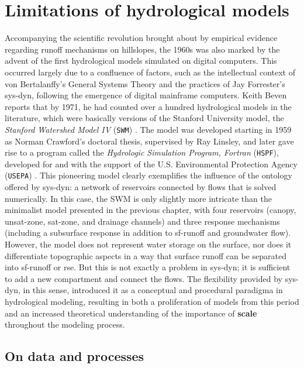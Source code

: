 \documentclass[./main_en.tex]{subfiles}
\begin{document}
\section{Limitations of hydrological models} \label{sec:hydro:others}

\par Accompanying the scientific revolution brought about by empirical evidence regarding runoff mechanisms on hillslopes, the 1960s was also marked by the advent of the first hydrological models simulated on digital computers. This occurred largely due to a confluence of factors, such as the intellectual context of von Bertalanffy's General Systems Theory and the practices of Jay Forrester's \gls{sys-dyn}, following the emergence of digital mainframe computers. Keith Beven reports that by 1971, he had counted over a hundred hydrological models in the literature, which were basically versions of the Stanford University \gls{model}, the \textit{Stanford Watershed Model IV} (\texttt{SWM}) \cite{Beven2019a}. The \gls{model} was developed starting in 1959 as Norman Crawford's doctoral thesis, supervised by Ray Linsley, and later gave rise to a program called the \textit{Hydrologic Simulation Program, Fortran} (\texttt{HSPF}), developed for and with the support of the U.S. Environmental Protection Agency (\texttt{USEPA}) \cite{Burges2004a}. This pioneering \gls{model} clearly exemplifies the influence of the ontology offered by \gls{sys-dyn}: a network of reservoirs connected by flows that is solved numerically. In this case, the SWM is only slightly more intricate than the minimalist \gls{model} presented in the previous chapter, with four reservoirs (canopy, \gls{unsat-zone}, \gls{sat-zone}, and drainage channels) and three response mechanisms (including a subsurface response in addition to \gls{sf-runoff} and groundwater flow). However, the \gls{model} does not represent water storage on the surface, nor does it differentiate topographic aspects in a way that surface runoff can be separated into \gls{sf-runoff} or \gls{rse}. But this is not exactly a problem in \gls{sys-dyn}; it is sufficient to add a new compartment and connect the flows. The flexibility provided by \gls{sys-dyn}, in this sense, introduced it as a conceptual and procedural \gls{paradigma} in hydrological modeling, resulting in both a proliferation of models from this period and an increased theoretical understanding of the importance of \textbf{scale} throughout the modeling process.

\subsection{On data and processes} \label{sec:hydro:databased}
\end{document}
